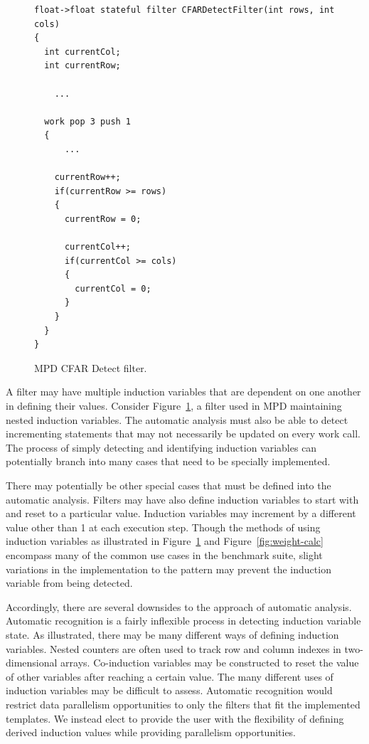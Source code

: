 \begin{figure}[t]
{\eightpoint
\begin{verbatim}
float->float stateful filter CFARDetectFilter(int rows, int cols)
{
  int currentCol;
  int currentRow;

    ...

  work pop 3 push 1
  {
      ...

    currentRow++;
    if(currentRow >= rows)
    {
      currentRow = 0;

      currentCol++;
      if(currentCol >= cols)
      {
        currentCol = 0;
      }
    }
  }
}
\end{verbatim}
\caption{MPD CFAR Detect filter.\protect\label{fig:cfar-detect-filter}}}
\end{figure}

A filter may have multiple induction variables that are dependent on one another in defining their values.  Consider Figure~\ref{fig:cfar-detect-filter}, a filter used in MPD maintaining nested induction variables.  The automatic analysis must also be able to detect incrementing statements that may not necessarily be updated on every work call.  The process of simply detecting and identifying induction variables can potentially branch into many cases that need to be specially implemented.

There may potentially be other special cases that must be defined into the automatic analysis.  Filters may have also define induction variables to start with and reset to a particular value.  Induction variables may increment by a different value other than 1 at each execution step.  Though the methods of using induction variables as illustrated in Figure~\ref{fig:cfar-detect-filter} and Figure~\ref{fig:weight-calc} encompass many of the common use cases in the benchmark suite, slight variations in the implementation to the pattern may prevent the induction variable from being detected.

Accordingly, there are several downsides to the approach of automatic analysis.  Automatic recognition is a fairly inflexible process in detecting induction variable state.  As illustrated, there may be many different ways of defining induction variables.  Nested counters are often used to track row and column indexes in two-dimensional arrays.  Co-induction variables may be constructed to reset the value of other variables after reaching a certain value.  The many different uses of induction variables may be difficult to assess.  Automatic recognition would restrict data parallelism opportunities to only the filters that fit the implemented templates.  We instead elect to provide the user with the flexibility of defining derived induction values while providing parallelism opportunities.  

